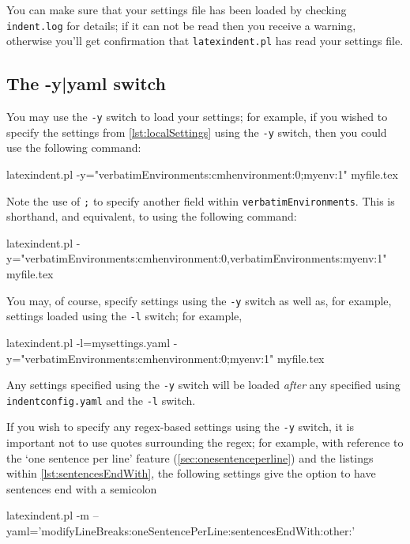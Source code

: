 	You can make sure that your settings file has been loaded by checking
	\texttt{indent.log} for details; if it can not be read then you receive a warning,
	otherwise you'll get confirmation that \texttt{latexindent.pl} has read your settings
	file.

\subsection{The -y|yaml switch}\label{sec:yamlswitch}
	You%
	 may use the
	\texttt{-y} switch to load your settings;  for example, if you wished to
	specify the settings from \cref{lst:localSettings} using the \texttt{-y} switch,
	then you could use the following command:
	\begin{commandshell}
latexindent.pl -y="verbatimEnvironments:cmhenvironment:0;myenv:1" myfile.tex
\end{commandshell}
	Note the use of \texttt{;} to specify another field within
	\texttt{verbatimEnvironments}. This is shorthand, and equivalent, to using the following
	command:
	\begin{commandshell}
latexindent.pl -y="verbatimEnvironments:cmhenvironment:0,verbatimEnvironments:myenv:1" myfile.tex
\end{commandshell}
	You may, of course, specify settings using the \texttt{-y} switch as well as,
	for example, settings loaded using the \texttt{-l} switch; for example,
	\begin{commandshell}
latexindent.pl -l=mysettings.yaml -y="verbatimEnvironments:cmhenvironment:0;myenv:1" myfile.tex
\end{commandshell}
	Any settings specified using the \texttt{-y} switch will be loaded
	\emph{after} any specified using \texttt{indentconfig.yaml} and the
	\texttt{-l} switch.

	If you wish to specify any regex-based settings using the \texttt{-y} switch,
	 it is important not to use quotes surrounding the regex; for
	example, with reference to the `one sentence per line' feature (\vref{sec:onesentenceperline})
	and the listings within \vref{lst:sentencesEndWith}, the following settings give the option
	to have sentences end with a semicolon
	\begin{commandshell}
latexindent.pl -m --yaml='modifyLineBreaks:oneSentencePerLine:sentencesEndWith:other:\;'
\end{commandshell}

